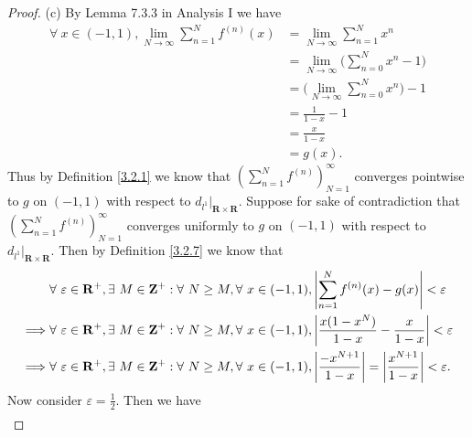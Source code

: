 \begin{proof}{(c)}
    By Lemma 7.3.3 in Analysis I we have
    \begin{align*}
        \forall\ x \in (-1, 1), \lim_{N \to \infty} \sum_{n = 1}^N f^{(n)}(x) & = \lim_{N \to \infty} \sum_{n = 1}^N x^n                 \\
                                                                              & = \lim_{N \to \infty} \bigg(\sum_{n = 0}^N x^n - 1\bigg) \\
                                                                              & = \bigg(\lim_{N \to \infty} \sum_{n = 0}^N x^n\bigg) - 1 \\
                                                                              & = \frac{1}{1 - x} - 1                                    \\
                                                                              & = \frac{x}{1 - x}                                        \\
                                                                              & = g(x).
    \end{align*}
    Thus by Definition \ref{3.2.1} we know that \((\sum_{n = 1}^N f^{(n)})_{N = 1}^\infty\) converges pointwise to \(g\) on \((-1, 1)\) with respect to \(d_{l^1}|_{\mathbf{R} \times \mathbf{R}}\).
    Suppose for sake of contradiction that \((\sum_{n = 1}^N f^{(n)})_{N = 1}^\infty\) converges uniformly to \(g\) on \((-1, 1)\) with respect to \(d_{l^1}|_{\mathbf{R} \times \mathbf{R}}\).
    Then by Definition \ref{3.2.7} we know that
    \begin{align*}
                 & \forall\ \varepsilon \in \mathbf{R}^+, \exists\ M \in \mathbf{Z}^+ : \forall\ N \geq M, \forall\ x \in (-1, 1), \abs*{\sum_{n = 1}^N f^{(n)}(x) - g(x)} < \varepsilon                           \\
        \implies & \forall\ \varepsilon \in \mathbf{R}^+, \exists\ M \in \mathbf{Z}^+ : \forall\ N \geq M, \forall\ x \in (-1, 1), \abs*{\frac{x(1 - x^N)}{1 - x} - \frac{x}{1 - x}} < \varepsilon                 \\
        \implies & \forall\ \varepsilon \in \mathbf{R}^+, \exists\ M \in \mathbf{Z}^+ : \forall\ N \geq M, \forall\ x \in (-1, 1), \abs*{\frac{-x^{N + 1}}{1 - x}} = \abs*{\frac{x^{N + 1}}{1 - x}} < \varepsilon.
    \end{align*}
    Now consider \(\varepsilon = \frac{1}{2}\).
    Then we have
    \begin{align*}

\end{align*}
\end{proof}
